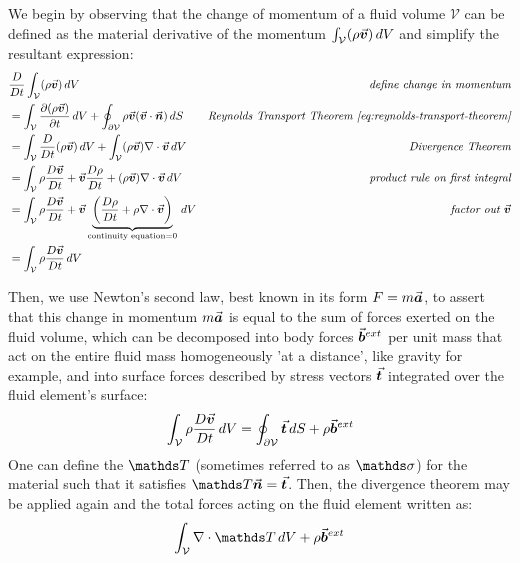 We begin by observing that the change of momentum of a fluid volume $\mathcal{V}$ can be defined as the material derivative of the momentum $\int_\mathcal{V}(\rho\vec{\bm{v}})\,dV$ and simplify the resultant expression\autocite*{continuum-intro}:
\begin{align}
     & \frac{D}{Dt}\int_\mathcal{V}(\rho\vec{\bm{v}})\,dV                                                                                                                    & \textit{define change in momentum}      \\ & = \int_\mathcal{V} \frac{\partial (\rho\vec{\bm{v}})}{\partial t}\,dV + \oint_{\partial \mathcal{V}} \rho \vec{\bm{v}} (\vec{\bm{v}} \cdot \vec{\bm{n}})\,dS & \textit{Reynolds Transport Theorem \ref{eq:reynolds-transport-theorem}} \\
     & = \int_\mathcal{V}\frac{D}{Dt}(\rho\vec{\bm{v}})\,dV + \int_\mathcal{V} (\rho\vec{\bm{v}} )\nabla\cdot\vec{\bm{v}} \,dV                                                         & \textit{Divergence Theorem}             \\
     & = \int_\mathcal{V} \rho\frac{D\vec{\bm{v}}}{Dt} + \vec{\bm{v}}\frac{D\rho}{Dt} + (\rho\vec{\bm{v}}) \nabla\cdot\vec{\bm{v}} \,dV                                                     & \textit{product rule on first integral} \\
     & = \int_\mathcal{V} \rho\frac{D\vec{\bm{v}}}{Dt} + \vec{\bm{v}} \underbrace{\left( \frac{D\rho}{Dt} + \rho \nabla\cdot\vec{\bm{v}} \right)}_{\text{continuity equation} =0} \,dV & \textit{factor out $\vec{\bm{v}}$}           \\\label{eq:momentum-lhs}
     & = \int_\mathcal{V} \rho\frac{D\vec{\bm{v}}}{Dt} \,dV
\end{align}

Then, we use Newton's second law, best known in its form $F=m\vec{\bm{a}}$, to assert that this change in momentum $m\vec{\bm{a}}$ is equal to the sum of forces exerted on the fluid volume, which can be decomposed into body forces $\vec{\bm{b}}^{ext}$ per unit mass\autocite*{continuum-intro} that act on the entire fluid mass homogeneously 'at a distance'\autocite*{anderson}, like gravity for example, and into surface forces described by stress vectors $\vec{\bm{t}}$ integrated over the fluid element's surface\autocite*{continuum-intro}:
\begin{equation}
    \int_\mathcal{V} \rho\frac{D\vec{\bm{v}}}{Dt} \,dV = \oint_\mathcal{\partial V}\vec{\bm{t}}\,dS + \rho\vec{\bm{b}}^{ext}
\end{equation}
One can define the  $\mat{T}$ (sometimes referred to as $\mat{\sigma}$) for the material such that it satisfies $\mat{T}\vek{n} = \vek{t}$\autocite*{continuum-intro}. Then, the divergence theorem may be applied again and the total forces acting on the fluid element written as:
\begin{equation}\label{eq:momentum-total-forces}
    \int_\mathcal{V}\nabla\cdot\mat{T}\,dV + \rho\vek{b}^{ext}
\end{equation}


